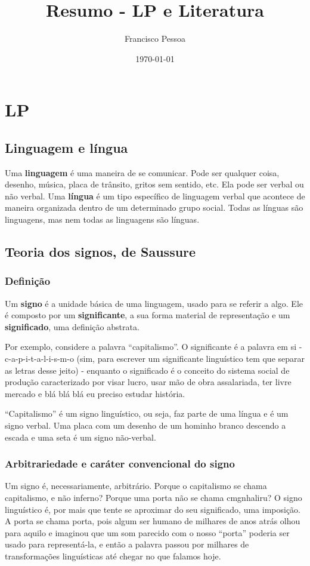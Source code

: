 \documentclass{article}
\author{Francisco Pessoa}
\date{\today}
\title{Resumo - LP e Literatura}
\begin{document}
\maketitle
\tableofcontents

\section{LP}

\subsection{Linguagem e língua}
Uma \textbf{linguagem} é uma maneira de se comunicar. Pode ser qualquer coisa, desenho, música, placa de trânsito, gritos sem sentido, etc. Ela pode ser verbal ou não verbal. Uma \textbf{língua} é um tipo específico de linguagem verbal que acontece de maneira organizada dentro de um determinado grupo social. Todas as línguas são linguagens, mas nem todas as linguagens são línguas.

\subsection{Teoria dos signos, de Saussure}
\subsubsection{Definição}
Um \textbf{signo} é a unidade básica de uma linguagem, usado para se referir a algo. Ele é composto por um \textbf{significante}, a sua forma material de representação e um \textbf{significado}, uma definição abstrata.

Por exemplo, considere a palavra ``capitalismo''. O significante é a palavra em si - \mbox{c-a-p-i-t-a-l-i-s-m-o} (sim, para escrever um significante linguístico tem que separar as letras desse jeito) - enquanto o significado é o conceito do sistema social de produção caracterizado por visar lucro, usar mão de obra assalariada, ter livre mercado e blá blá blá eu preciso estudar história.

``Capitalismo'' é um signo linguístico, ou seja, faz parte de uma língua e é um signo verbal. Uma placa com um desenho de um hominho branco descendo a escada e uma seta é um signo não-verbal.

\subsubsection{Arbitrariedade e caráter convencional do signo}
Um signo é, necessariamente, arbitrário. Porque o capitalismo se chama capitalismo, e não inferno? Porque uma porta não se chama \mbox{cmgnhaliru}?  O signo linguístico é, por mais que tente se aproximar do seu significado, uma imposição. A porta se chama porta, pois algum ser humano de milhares de anos atrás olhou para aquilo e imaginou que um som parecido com o nosso ``porta'' poderia ser usado para representá-la, e então a palavra passou por milhares de transformações linguísticas até chegar no que falamos hoje.
\end{document}
